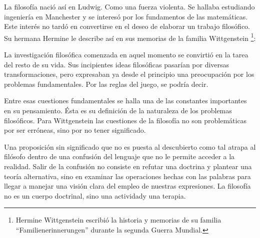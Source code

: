 La filosofía nació así en Ludwig. Como una fuerza violenta. Se hallaba
estudiando ingeniería en Manchester y se interesó por los fundamentos de las
matemáticas. Este interés no tardó en convertirse en el deseo de elaborar un
trabajo filosófico. Su hermana Hermine le describe así en sus memorias de la
familia Wittgenstein
\footnote{Hermine Wittgenstein escribió la historia y memorias de su familia
  ``Familienerinnerungen'' durante la segunda Guerra Mundial.}:


La investigación filosófica comenzada en aquel momento se convirtió en la tarea
del resto de su vida. Sus incipientes ideas filosóficas pasarían por diversas
transformaciones, pero expresaban ya desde el principio una preocupación por los
problemas fundamentales. Por las reglas del juego, se podría decir.

Entre esas cuestiones fundamentales se halla una de las constantes importantes
en su pensamiento. Ésta es su definición de la naturaleza de los problemas
filosóficos. Para Wittgenstein las cuestiones de la filosofía no son
problemáticas por ser erróneas, sino por no tener
significado.\autocite[cf.~][4.003]{wittgenstein1922tractatus}

Una proposición sin significado que no es puesta al descubierto como tal atrapa
al filósofo dentro de una confusión del lenguaje que no le permite acceder a la
realidad. Salir de la confusión no consiste en refutar una doctrina y plantear
una teoría alternativa, sino en examinar las operaciones hechas con las palabras
para llegar a manejar una visión clara del empleo de nuestras expresiones. La
filosofía no es un cuerpo doctrinal, sino una
actividad\autocite[cf.~][4.112]{wittgenstein1922tractatus}y una
terapia\autocite[cf.~][\S133]{wittgenstein1953phiinv}.

